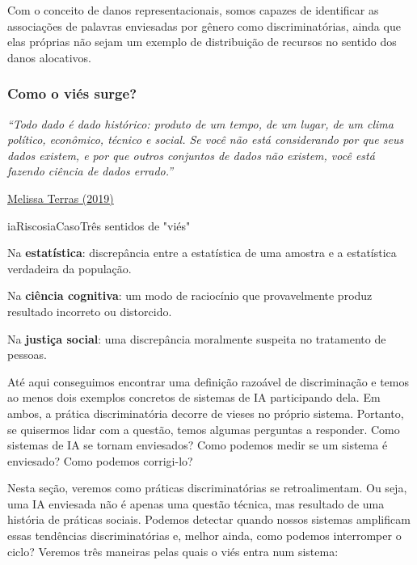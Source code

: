 \documentclass[
  11pt,
]{article}
\renewenvironment{quote}
  {\begin{tcolorbox}[
      breakable, enhanced jigsaw, rounded corners,
      arc=3pt, boxrule=0pt, frame hidden,
      colback=iaCaso,
      borderline west={3pt}{0pt}{iaRiscos},
      left=12pt, right=10pt, top=9pt, bottom=9pt,
      before skip=9pt, after skip=9pt]}
  {\end{tcolorbox}}
\newenvironment{definicao}[1][Definicao]{\begin{iabox}{iaRiscos}{iaCaso}{#1}}{\end{iabox}}
\begin{document}
Com o conceito de danos representacionais, somos capazes de identificar
as associações de palavras enviesadas por gênero como discriminatórias,
ainda que elas próprias não sejam um exemplo de distribuição de recursos
no sentido dos danos alocativos.

\subsubsection{Como o viés surge?}\label{como-o-viuxe9s-surge}

\begin{quote}
\emph{``Todo dado é dado histórico: produto de um tempo, de um lugar, de
um clima político, econômico, técnico e social. Se você não está
considerando por que seus dados existem, e por que outros conjuntos de
dados não existem, você está fazendo ciência de dados errado.''}

\href{https://www.youtube.com/watch?v=4yYytLUViI4}{Melissa Terras
(2019)}
\end{quote}

\begin{definicao}[Três sentidos de "viés"]

Na \textbf{estatística}: discrepância entre a estatística de uma amostra
e a estatística verdadeira da população.

Na \textbf{ciência cognitiva}: um modo de raciocínio que provavelmente
produz resultado incorreto ou distorcido.

Na \textbf{justiça social}: uma discrepância moralmente suspeita no
tratamento de pessoas.

\end{definicao}

Até aqui conseguimos encontrar uma definição razoável de discriminação e
temos ao menos dois exemplos concretos de sistemas de IA participando
dela. Em ambos, a prática discriminatória decorre de vieses no próprio
sistema. Portanto, se quisermos lidar com a questão, temos algumas
perguntas a responder. Como sistemas de IA se tornam enviesados? Como
podemos medir se um sistema é enviesado? Como podemos corrigi-lo?

Nesta seção, veremos como práticas discriminatórias se retroalimentam.
Ou seja, uma IA enviesada não é apenas uma questão técnica, mas
resultado de uma história de práticas sociais. Podemos detectar quando
nossos sistemas amplificam essas tendências discriminatórias e, melhor
ainda, como podemos interromper o ciclo? Veremos três maneiras pelas
quais o viés entra num sistema:
\end{document}
